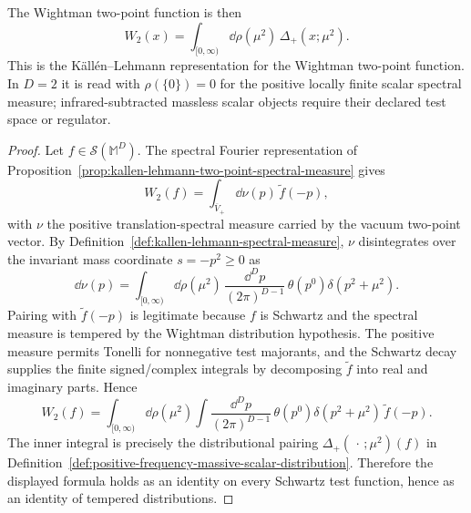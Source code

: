 \begin{proposition}
\label{prop:kallen-lehmann-wightman-representation}
The Wightman two-point function is then
\[
  W_2(x)
  =
  \int_{[0,\infty)}
  \dd\rho(\mu^2)\,
  \Delta_+(x;\mu^2).
\]
This is the K\"all\'en--Lehmann representation for the Wightman two-point
function.  In \(D=2\) it is read with \(\rho(\{0\})=0\) for the positive
locally finite scalar spectral measure; infrared-subtracted massless scalar
objects require their declared test space or regulator.
\end{proposition}

\begin{proof}
Let \(f\in\mathcal S(\mathbb M^D)\).  The spectral Fourier representation of
Proposition~\ref{prop:kallen-lehmann-two-point-spectral-measure} gives
\[
  W_2(f)
  =
  \int_{\overline V_+}\dd\nu(p)\,\widetilde f(-p),
\]
with \(\nu\) the positive translation-spectral measure carried by the vacuum
two-point vector.  By
Definition~\ref{def:kallen-lehmann-spectral-measure}, \(\nu\) disintegrates
over the invariant mass coordinate \(s=-p^2\ge0\) as
\[
  \dd\nu(p)
  =
  \int_{[0,\infty)}\dd\rho(\mu^2)\,
  \frac{\dd^Dp}{(2\pi)^{D-1}}\,
  \theta(p^0)\delta(p^2+\mu^2).
\]
Pairing with \(\widetilde f(-p)\) is legitimate because \(f\) is Schwartz and
the spectral measure is tempered by the Wightman distribution hypothesis.  The
positive measure permits Tonelli for nonnegative test majorants, and the
Schwartz decay supplies the finite signed/complex integrals by decomposing
\(\widetilde f\) into real and imaginary parts.  Hence
\[
  W_2(f)
  =
  \int_{[0,\infty)}\dd\rho(\mu^2)
  \int\frac{\dd^Dp}{(2\pi)^{D-1}}\,
  \theta(p^0)\delta(p^2+\mu^2)\,\widetilde f(-p).
\]
The inner integral is precisely the distributional pairing
\(\Delta_+(\,\cdot\,;\mu^2)(f)\) in
Definition~\ref{def:positive-frequency-massive-scalar-distribution}.
Therefore the displayed formula holds as an identity on every Schwartz test
function, hence as an identity of tempered distributions.
\end{proof}

